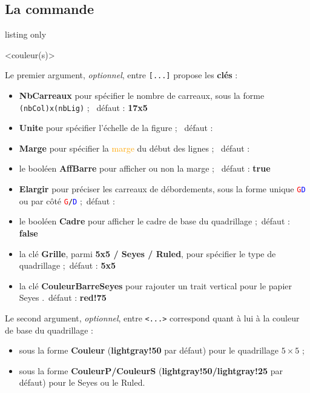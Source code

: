 \documentclass[a4paper]{article}
\newcommand\Cle[1]{{\bfseries\sffamily\textlangle #1\textrangle}}
\begin{document}
\subsection{La commande}

\begin{PresentationCode}{listing only}

\AffQuadrillage[clés]<couleur(s)>
\end{PresentationCode}

Le premier argument, \textit{optionnel}, entre \texttt{[...]} propose les \Cle{clés} :

\begin{itemize}
	\item \Cle{NbCarreaux} pour spécifier le nombre de carreaux, sous la forme \texttt{(nbCol)x(nbLig)} ; \hfill~défaut : \Cle{17x5}
	\item \Cle{Unite} pour spécifier l'échelle de la figure ; \hfill~défaut : \Cle{1}
	\item \Cle{Marge} pour spécifier la \textcolor{orange}{marge} du début des lignes ; \hfill~défaut : \Cle{0}
	\item le booléen \Cle{AffBarre} pour afficher ou non la marge ; \hfill~défaut : \Cle{true}
	\item \Cle{Elargir} pour préciser les carreaux de débordements, sous la forme unique \texttt{\textcolor{red}{G}\textcolor{blue}{D}} ou par côté \texttt{\textcolor{red}{G}/\textcolor{blue}{D}} ;\hfill~défaut : \Cle{0}
	\item le booléen \Cle{Cadre} pour afficher le cadre de base du quadrillage ;\hfill~défaut : \Cle{false}
	\item la clé \Cle{Grille}, parmi \Cle{5x5 / Seyes / Ruled}, pour spécifier le type de quadrillage ;\hfill~défaut : \Cle{5x5}
	\item la clé \Cle{CouleurBarreSeyes} pour rajouter un trait vertical pour le papier Seyes .\hfill~défaut : \Cle{red!75}
\end{itemize}

Le second argument, \textit{optionnel}, entre \texttt{<...>} correspond quant à lui à la couleur de base du quadrillage :

\begin{itemize}
	\item sous la forme \Cle{Couleur} (\Cle{lightgray!50} par défaut) pour le quadrillage $5\times5$ ;
	\item sous la forme \Cle{CouleurP/CouleurS} (\Cle{lightgray!50/lightgray!25} par défaut) pour le Seyes ou le Ruled.
\end{itemize}
\end{document}
